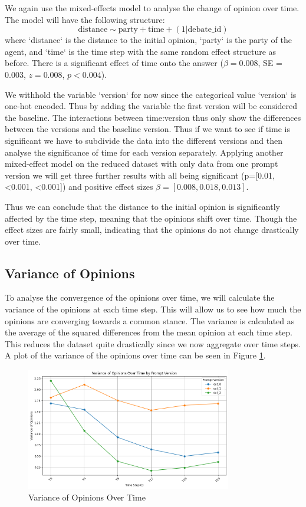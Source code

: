 \documentclass[12pt]{article}
\begin{document}
We again use the mixed-effects model to analyse the change of opinion over time. The model will have the following structure:
\begin{equation}
    \text{distance} \sim \text{party} + \text{time} + (1 | \text{debate\_id})
\end{equation}
where `distance` is the distance to the initial opinion, `party` is the party of the agent, and `time` is the time step with the same random effect structure as before. There is a significant effect of time onto the answer  ($\beta = 0.008$, SE = 0.003, $z = 0.008$, $p < 0.004$).

We withhold the variable `version` for now since the categorical value `version` is one-hot encoded. Thus by adding the variable the first version will be considered the baseline. The interactions between time:version thus only show the differences between the versions and the baseline version. Thus if we want to see if time is significant we have to subdivide the data into the different versions and then analyse the significance of time for each version separately. Applying another mixed-effect model on the reduced dataset with only data from one prompt version we will get three further results with all being significant (p=[0.01,\textless 0.001, \textless 0.001]) and positive effect sizes $\beta=[0.008,0.018,0.013]$. 

Thus we can conclude that the distance to the initial opinion is significantly affected by the time step, meaning that the opinions shift over time. Though the effect sizes are fairly small, indicating that the opinions do not change drastically over time. 


\subsection{Variance of Opinions}
To analyse the convergence of the opinions over time, we will calculate the variance of the opinions at each time step. This will allow us to see how much the opinions are converging towards a common stance. The variance is calculated as the average of the squared differences from the mean opinion at each time step. This reduces the dataset quite drastically since we now aggregate over time steps. A plot of the variance of the opinions over time can be seen in Figure \ref{fig:variance_of_opinions}. 


\begin{figure}[h]
\centering
\includegraphics[width=0.8\textwidth]{img/variance_of_opinions.png}
\caption{Variance of Opinions Over Time}
\label{fig:variance_of_opinions}
\end{figure}
\end{document}
